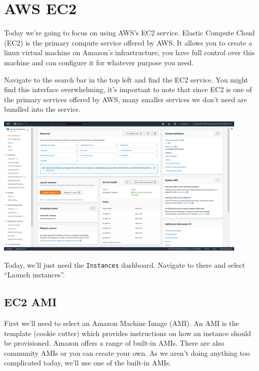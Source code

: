 \documentclass{csse4400}
\begin{document}
\begin{enumerate}

\end{enumerate}

\section{AWS EC2}

Today we're going to focus on using AWS's EC2 service.
Elastic Compute Cloud (EC2) is the primary compute service offered by AWS.
It allows you to create a linux virtual machine on Amazon's infrastructure,
you have full control over this machine and can configure it for whatever purpose you need.

Navigate to the search bar in the top left and find the EC2 service.
You might find this interface overwhelming,
it's important to note that since EC2 is one of the primary services offered by AWS,
many smaller services we don't need are bundled into the service.

\includegraphics[width=0.9\textwidth]{images/ec2-interface}

Today, we'll just need the \texttt{Instances} dashboard.
Navigate to there and select ``Launch instances''.

\subsection{EC2 AMI}
First we'll need to select an Amazon Machine Image (AMI).
An AMI is the template (cookie cutter) which provides instructions on how an instance should be provisioned.
Amazon offers a range of built-in AMIs. There are also community AMIs or you can create your own.
As we aren't doing anything too complicated today, we'll use one of the built-in AMIs.
\end{document}
